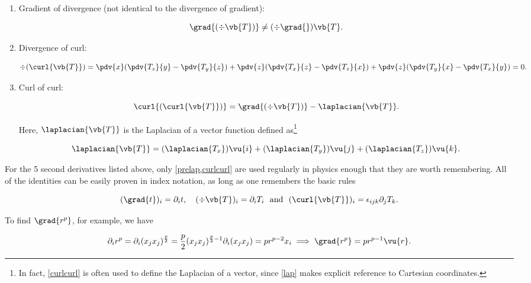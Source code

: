 \documentclass[english,a4paper,12pt]{report}
\begin{document}
\begin{enumerate}
	\item Gradient of divergence (not identical to the divergence of gradient):
		
	\begin{equation} 
		\grad{(\div{\vb{T}})} \neq (\div{\grad{} } )\vb{T}. 
	\end{equation}
		
	\item Divergence of curl:
		
	\begin{equation} 
		\div{(\curl{\vb{T}})} = \pdv{x}(\pdv{T_z}{y} - \pdv{T_y}{z}) + \pdv{z}(\pdv{T_x}{z} - \pdv{T_z}{x}) + \pdv{z}(\pdv{T_y}{x} - \pdv{T_x}{y}) = 0. \label{divcurl} 
	\end{equation}
		
	\item Curl of curl:
		
	\begin{equation} 
		\curl{(\curl{\vb{T}})} = \grad{(\div{\vb{T}})} - \laplacian{\vb{T}}. \label{curlcurl} 
	\end{equation} 
		
	Here, \(\laplacian{\vb{T}}\) is the Laplacian of a vector function defined as\footnote{In fact, \cref{curlcurl} is often used to define the Laplacian of a vector, since \cref{lap} makes explicit reference to Cartesian coordinates.}
		
	\begin{equation} 
		\laplacian{\vb{T}} = (\laplacian{T_x})\vu{i} + (\laplacian{T_y})\vu{j} + (\laplacian{T_z})\vu{k}. 
	\end{equation}	
\end{enumerate}	
	
For the 5 second derivatives listed above, only \cref{prelap,curlcurl} are used regularly in physics enough that they are worth remembering. All of the identities can be easily proven in index notation, as long as one remembers the basic rules 

\begin{equation}
	(\grad{t} )_{i} = \partial _{i}t, \quad (\div{\vb{T} } )_{i} = \partial _{i}T_{i} ~\text { and }~ (\curl{\vb{T} } )_{i} = \epsilon _{ijk}\partial _{j}T_{k}.          
\end{equation}

To find \(\grad{r^{p} } \), for example, we have 

\begin{equation}
	\partial _{i}r^{p} = \partial _{i}(x_{j}x_{j}  )^{\frac{p}{2} } = \frac{p}{2}(x_{j}x_{j})^{\frac{p}{2}-1 } \partial _{i}(x_{j}x_{j}  ) = pr^{p-2}x_{i} \implies \grad{r^{p} } = pr^{p-1}\vu{r} .           
\end{equation}
\end{document}

